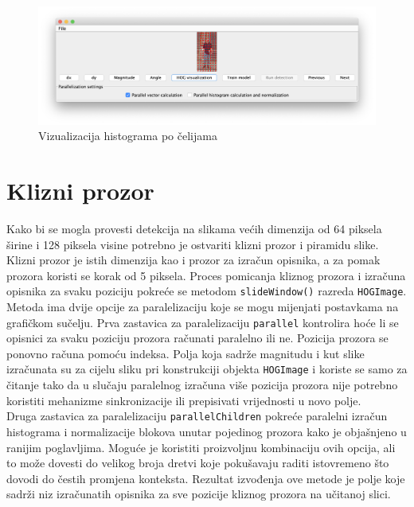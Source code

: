 \documentclass[times, utf8, zavrsni]{fer}
\begin{document}
\begin{figure}[htb]
	\centering
	\includegraphics[width=\linewidth]{figures/hogVisualization.png}
	\caption{Vizualizacija histograma po čelijama}
	\label{fig:hog}
\end{figure}

\section{Klizni prozor}
Kako bi se mogla provesti detekcija na slikama većih dimenzija od 64 piksela širine i 128 piksela visine potrebno je ostvariti klizni prozor i piramidu slike. Klizni prozor je istih dimenzija kao i prozor za izračun opisnika, a za pomak prozora koristi se korak od 5 piksela. Proces pomicanja kliznog prozora i izračuna opisnika za svaku poziciju pokreće se metodom \verb|slideWindow()| razreda \verb|HOGImage|. Metoda ima dvije opcije za paralelizaciju koje se mogu mijenjati postavkama na grafičkom sučelju. Prva zastavica za paralelizaciju \verb|parallel| kontrolira hoće li se opisnici za svaku poziciju prozora računati paralelno ili ne. Pozicija prozora se ponovno računa pomoću indeksa. Polja koja sadrže magnitudu i kut slike izračunata su za cijelu sliku pri konstrukciji objekta \verb|HOGImage| i koriste se samo za čitanje tako da u slučaju paralelnog izračuna više pozicija prozora nije potrebno koristiti mehanizme sinkronizacije ili prepisivati vrijednosti u novo polje. \\

Druga zastavica za paralelizaciju \verb|parallelChildren| pokreće paralelni izračun histograma i normalizacije blokova unutar pojedinog prozora kako je objašnjeno u ranijim poglavljima. Moguće je koristiti proizvoljnu kombinaciju ovih opcija, ali to može dovesti do velikog broja dretvi koje pokušavaju raditi istovremeno što dovodi do čestih promjena konteksta. Rezultat izvođenja ove metode je polje koje sadrži niz izračunatih opisnika za sve pozicije kliznog prozora na učitanoj slici.
\end{document}

